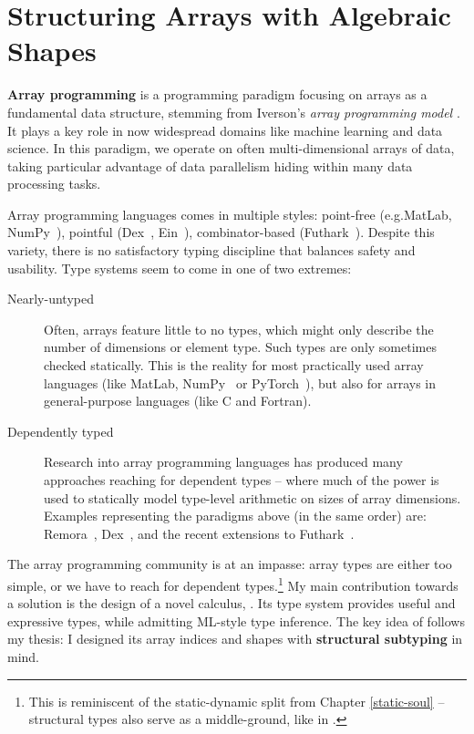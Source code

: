 \chapter{Structuring Arrays with Algebraic Shapes}
\label{star}

\textbf{Array programming} is a programming paradigm focusing on arrays as a fundamental data structure, stemming from Iverson's \emph{array programming model} \cite{apl}. It plays a key role in now widespread domains like machine learning and data science. In this paradigm, we operate on often multi-dimensional arrays of data, taking particular advantage of data parallelism hiding within many data processing tasks. 

Array programming languages comes in multiple styles: point-free (e.g.\@ MatLab, NumPy~\cite{numpy}), pointful (Dex~\cite{dex}, Ein~\cite{ein}), combinator-based (Futhark~\cite{futhark}). Despite this variety, there is no satisfactory typing discipline that balances safety and usability. Type systems seem to come in one of two extremes: \begin{description}
    \item[Nearly-untyped] Often, arrays feature little to no types, which might only describe the number of dimensions or element type. Such types are only sometimes checked statically. This is the reality for most practically used array languages (like MatLab, NumPy~\cite{numpy} or PyTorch~\cite{pytorch}), but also for arrays in general-purpose languages (like C and Fortran).
    \item[Dependently typed] Research into array programming languages has produced many approaches reaching for dependent types -- where much of the power is used to statically model type-level arithmetic on sizes of array dimensions. Examples representing the paradigms above (in the same order) are: Remora~\cite{remora}, Dex~\cite{dex}, and the recent extensions to Futhark~\cite{futhark-size-dependent, futhark-size-dependent-towards}.
\end{description}

The array programming community is at an impasse: array types are either too simple, or we have to reach for dependent types.\footnote{This is reminiscent of the static-dynamic split from Chapter \ref{static-soul} -- structural types also serve as a middle-ground, like in \starr{}.} My main contribution towards a solution is the design of a novel calculus, \textbf{\starr{}}. Its type system provides useful and expressive types, while admitting ML-style type inference.
The key idea of \starr{} follows my thesis: I designed its array indices and shapes with \textbf{structural subtyping} in mind.

